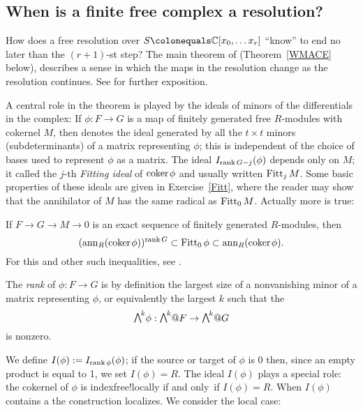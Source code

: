 \subsection*{When is a finite free complex a resolution?}
How does a free resolution over $S \colonequals  \CC[x_0, \dots x_r]$
``know'' to end no later than the $(r+1)$-st step?
The main theorem of \cite{WMACE} (Theorem~\ref{WMACE} below),  describes a sense in which the maps in the resolution
change as the resolution continues. See \cite[Theorem 20.9]{Eisenbud1995}
for further exposition.

A central role in the theorem is played by the ideals of minors of the
differentials in the complex: If $\phi: F\to G$ is a map of finitely
generated free $R$-modules with cokernel $M$, then
denotes the ideal generated by all the $t\times t$ minors
(subdeterminants) of a matrix representing $\phi$; this is independent
of the choice of bases used to represent $\phi$ as a matrix.
The ideal $I_{\operatorname{rank} G -j}(\phi)$ depends only on $M$; it called the
$j$-th \emph{Fitting ideal} of ${\rm{coker}\kern1pt} \phi$  and
%
%
usually written $\operatorname{Fitt}_{j} M$. Some basic properties of these ideals are
given in Exercise~\ref{Fitt}, where the reader may show that the
annihilator of $M$ has the
same radical as $\operatorname{Fitt}_{0} M$. Actually more is true:

\begin{fact}
If $F\to G \to M \to 0$ is an exact sequence of finitely generated
$R$-modules, then
$$
({\rm{ann}}_{R}({\rm{coker}\kern1pt} \phi))^{\operatorname{rank} G}\subset \operatorname{Fitt}_{0}\phi \subset
{\rm{ann}}_{R}({\rm{coker}\kern1pt} \phi).
$$
For this and other such inequalities, see \cite{MR476736}.
\end{fact}

The \emph{rank} of $\phi: F\to G$ is by definition the largest size of a nonvanishing
%
minor of a matrix representing $\phi$,
or equivalently the largest $k$ such that the
%
$$\mwedge^{k}\phi : \mwedge^{k}@F \to \mwedge^{k}@G$$
is nonzero. 

We define
$I(\phi): = I_{\operatorname{rank} \phi}(\phi)$; if the source or target of $\phi$ is 0 then, since an empty
product is equal to 1,
we set $I(\phi) = R$.  The ideal $I(\phi)$ plays a special role: the cokernel
of $\phi$
is  
index{free!locally}
 if and only~if $I(\phi) = R$. When
$I(\phi)$ contains a 
%
 the construction localizes. We consider the local case:

